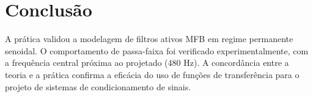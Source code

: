 \chapter{Conclusão}

A prática validou a modelagem de filtros ativos MFB em regime permanente senoidal. O comportamento de passa-faixa foi verificado experimentalmente, com a frequência central próxima ao projetado (480 Hz). A concordância entre a teoria e a prática confirma a eficácia do uso de funções de transferência para o projeto de sistemas de condicionamento de sinais.